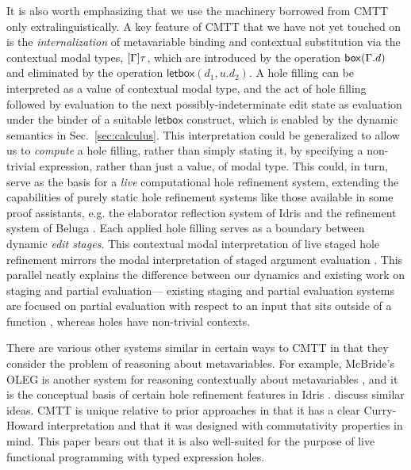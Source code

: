 It is also worth emphasizing that we use the machinery 
borrowed from CMTT only extralinguistically.
%
A key feature of CMTT that we have not yet touched on is the
\emph{internalization} of metavariable binding and contextual
substitution via the contextual modal types, $[\Gamma]\tau$, which
are introduced by the operation $\mathsf{box}(\Gamma.d)$ and
eliminated by the operation $\mathsf{letbox}(d_1, u.d_2)$.
%
A hole filling can be interpreted as a value of contextual modal
type, and the act of hole filling followed by evaluation to the next
possibly-indeterminate edit state as evaluation under the binder of a
suitable $\mathsf{letbox}$ construct, which is enabled by the dynamic
semantics in Sec.~\ref{sec:calculus}.
%
This interpretation could be generalized to allow us to \emph{compute} a hole filling, rather
than simply stating it, by specifying a non-trivial expression, rather than just a value, of
modal type.
%
This could, in turn, serve as the basis for a \emph{live} computational hole
refinement system, extending the capabilities of purely static hole
refinement systems like those available in some proof assistants,
e.g. the elaborator reflection system of Idris
\cite{brady2013idris,DBLP:conf/icfp/ChristiansenB16} and the refinement system of Beluga
\cite{DBLP:conf/flops/Pientka10,pientka2015inductive}.
%
Each applied hole filling serves as a boundary between dynamic
\emph{edit stages}.
%
This contextual modal interpretation of live staged hole refinement
mirrors the modal interpretation of staged argument evaluation
\cite{Davies:2001op}. 
%
This parallel neatly explains
the difference between our dynamics and existing work on staging and
partial evaluation---
existing staging and partial evaluation systems are focused on partial evaluation with respect to an input that sits outside of a
function \cite{Jones:1993uq}, whereas holes have non-trivial contexts.

There are various other systems similar in certain ways to CMTT in 
that they consider the problem of reasoning about metavariables. 
For example, McBride's OLEG is another system for reasoning contextually about metavariables
\cite{DBLP:phd/ethos/McBride00}, and it is the conceptual basis of certain hole refinement features in Idris \cite{brady2013idris}. \citet{DBLP:conf/csl/GeuversJ02} discuss similar ideas. CMTT is unique relative to prior approaches in that it has a clear Curry-Howard interpretation and that it was designed with commutativity properties in mind.
%
This paper bears out that it is also well-suited for the purpose of live functional programming with typed expression holes.

